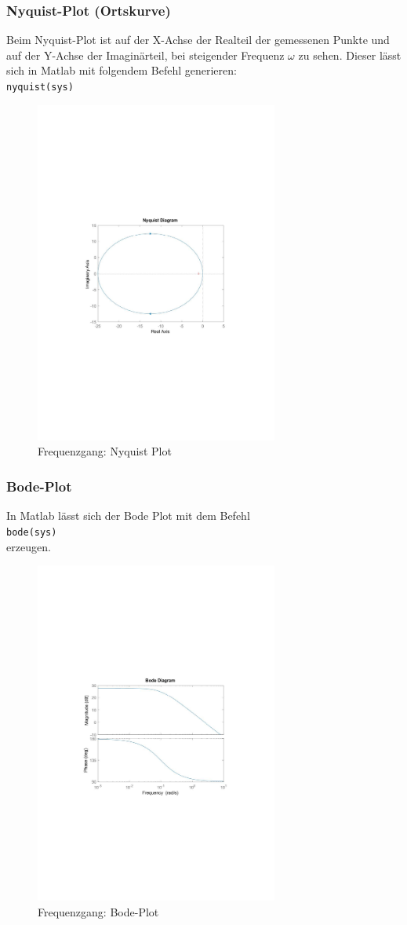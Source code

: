\subsubsection{Nyquist-Plot (Ortskurve)}
Beim Nyquist-Plot ist auf der X-Achse der Realteil der gemessenen Punkte
und auf der Y-Achse der Imaginärteil, bei steigender Frequenz $\omega$ zu sehen.
Dieser lässt sich in Matlab mit folgendem Befehl generieren:\\
\texttt{nyquist(sys)}
\begin{figure}[H]
    \centering
    \includegraphics[width=8cm]{image/NyquistPlot.pdf}
    \caption{Frequenzgang: Nyquist Plot}
\end{figure}
\subsubsection{Bode-Plot}
In Matlab lässt sich der Bode Plot mit dem Befehl\\
\texttt{bode(sys)}\\
erzeugen.
\begin{figure}[H]
    \centering
    \includegraphics[width=8cm]{image/BodeDiagramm.pdf}
    \caption{Frequenzgang: Bode-Plot}
\end{figure}
